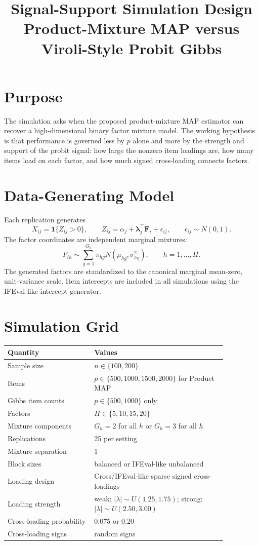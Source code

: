 \documentclass[11pt]{article}
\title{\vspace{-2em}Signal-Support Simulation Design\\
\large Product-Mixture MAP versus Viroli-Style Probit Gibbs}
\author{}
\date{\vspace{-1.5em}}
\newcommand{\ind}{\mathbf{1}}
\begin{document}
\maketitle

\section{Purpose}

The simulation asks when the proposed product-mixture MAP estimator can recover
a high-dimensional binary factor mixture model.  The working hypothesis is that
performance is governed less by $p$ alone and more by the strength and support
of the probit signal: how large the nonzero item loadings are, how many items
load on each factor, and how much signed cross-loading connects factors.

\section{Data-Generating Model}

Each replication generates
\[
  X_{ij} = \ind\{Z_{ij}>0\}, \qquad
  Z_{ij} = \alpha_j + \bm\lambda_j^\top \bm F_i + \epsilon_{ij},
  \qquad \epsilon_{ij}\sim N(0,1).
\]
The factor coordinates are independent marginal mixtures:
\[
  F_{ih}\sim \sum_{g=1}^{G_h}\pi_{hg}
  N(\mu_{hg},\sigma_{hg}^2), \qquad h=1,\ldots,H.
\]
The generated factors are standardized to the canonical marginal mean-zero,
unit-variance scale.  Item intercepts are included in all simulations using
the IFEval-like intercept generator.

\section{Simulation Grid}

\begin{center}
\begin{tabular}{L{0.34\linewidth}L{0.52\linewidth}}
\toprule
Quantity & Values \\
\midrule
Sample size & $n\in\{100,200\}$ \\
Items & $p\in\{500,1000,1500,2000\}$ for Product MAP \\
Gibbs item counts & $p\in\{500,1000\}$ only \\
Factors & $H\in\{5,10,15,20\}$ \\
Mixture components & $G_h=2$ for all $h$ or $G_h=3$ for all $h$ \\
Replications & 25 per setting \\
Mixture separation & 1 \\
Block sizes & balanced or IFEval-like unbalanced \\
Loading design & Cross/IFEval-like sparse signed cross-loadings \\
Loading strength & weak: $|\lambda|\sim U(1.25,1.75)$; strong: $|\lambda|\sim U(2.50,3.00)$ \\
Cross-loading probability & 0.075 or 0.20 \\
Cross-loading signs & random signs \\
\bottomrule
\end{tabular}
\end{center}
\end{document}
